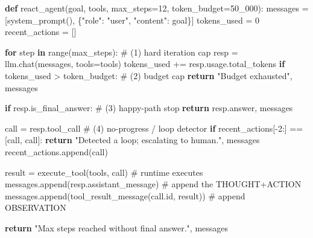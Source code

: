 \documentclass[11pt]{article}
\newenvironment{Shaded}{\begin{snugshade}}{\end{snugshade}}
\newcommand{\BuiltInTok}[1]{\textcolor[rgb]{0.50,0.55,0.55}{#1}}
\newcommand{\CommentTok}[1]{\textcolor[rgb]{0.48,0.49,0.49}{#1}}
\newcommand{\ControlFlowTok}[1]{\textcolor[rgb]{0.99,0.74,0.29}{\textbf{#1}}}
\newcommand{\DecValTok}[1]{\textcolor[rgb]{0.96,0.45,0.00}{#1}}
\newcommand{\KeywordTok}[1]{\textcolor[rgb]{0.81,0.81,0.76}{\textbf{#1}}}
\newcommand{\NormalTok}[1]{\textcolor[rgb]{0.81,0.81,0.76}{#1}}
\newcommand{\OperatorTok}[1]{\textcolor[rgb]{0.81,0.81,0.76}{#1}}
\newcommand{\StringTok}[1]{\textcolor[rgb]{0.96,0.31,0.31}{#1}}
\begin{document}
\begin{Shaded}
\begin{Highlighting}[]
\KeywordTok{def}\NormalTok{ react\_agent(goal, tools, max\_steps}\OperatorTok{=}\DecValTok{12}\NormalTok{, token\_budget}\OperatorTok{=}\DecValTok{50\_000}\NormalTok{):}
\NormalTok{    messages }\OperatorTok{=}\NormalTok{ [system\_prompt(), \{}\StringTok{"role"}\NormalTok{: }\StringTok{"user"}\NormalTok{, }\StringTok{"content"}\NormalTok{: goal\}]}
\NormalTok{    tokens\_used }\OperatorTok{=} \DecValTok{0}
\NormalTok{    recent\_actions }\OperatorTok{=}\NormalTok{ []}

    \ControlFlowTok{for}\NormalTok{ step }\KeywordTok{in} \BuiltInTok{range}\NormalTok{(max\_steps):                 }\CommentTok{\# (1) hard iteration cap}
\NormalTok{        resp }\OperatorTok{=}\NormalTok{ llm.chat(messages, tools}\OperatorTok{=}\NormalTok{tools)}
\NormalTok{        tokens\_used }\OperatorTok{+=}\NormalTok{ resp.usage.total\_tokens}
        \ControlFlowTok{if}\NormalTok{ tokens\_used }\OperatorTok{\textgreater{}}\NormalTok{ token\_budget:            }\CommentTok{\# (2) budget cap}
            \ControlFlowTok{return} \StringTok{"Budget exhausted"}\NormalTok{, messages}

        \ControlFlowTok{if}\NormalTok{ resp.is\_final\_answer:                   }\CommentTok{\# (3) happy{-}path stop}
            \ControlFlowTok{return}\NormalTok{ resp.answer, messages}

\NormalTok{        call }\OperatorTok{=}\NormalTok{ resp.tool\_call}
        \CommentTok{\# (4) no{-}progress / loop detector}
        \ControlFlowTok{if}\NormalTok{ recent\_actions[}\OperatorTok{{-}}\DecValTok{2}\NormalTok{:] }\OperatorTok{==}\NormalTok{ [call, call]:}
            \ControlFlowTok{return} \StringTok{"Detected a loop; escalating to human."}\NormalTok{, messages}
\NormalTok{        recent\_actions.append(call)}

\NormalTok{        result }\OperatorTok{=}\NormalTok{ execute\_tool(tools, call)         }\CommentTok{\# runtime executes}
\NormalTok{        messages.append(resp.assistant\_message)    }\CommentTok{\# append the THOUGHT+ACTION}
\NormalTok{        messages.append(tool\_result\_message(call.}\BuiltInTok{id}\NormalTok{, result))  }\CommentTok{\# append OBSERVATION}

    \ControlFlowTok{return} \StringTok{"Max steps reached without final answer."}\NormalTok{, messages}
\end{Highlighting}
\end{Shaded}
\end{document}
